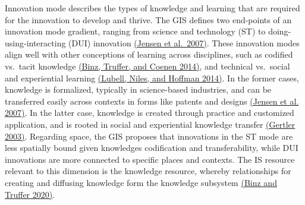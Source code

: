 \documentclass[twoside,12pt,final]{ucthesis-CA2012}
\begin{document}
\begin{ucmainmatter}
Innovation mode describes the types of knowledge and learning that are
required for the innovation to develop and thrive. The GIS defines two
end-points of an innovation mode gradient, ranging from \textquotesingle science and
technology\textquotesingle{} (ST) to \textquotesingle doing-using-interacting\textquotesingle{} (DUI) innovation
\href{https://www.zotero.org/google-docs/?hpQtSX}{(Jensen et al.~2007)}.
These innovation modes align well with other conceptions of learning
across disciplines, such as codified vs.~tacit knowledge \href{https://www.zotero.org/google-docs/?E8gm4b}{(Binz,
Truffer, and Coenen 2014)},
and technical vs.~social and experiential learning \href{https://www.zotero.org/google-docs/?bGAsYS}{(Lubell, Niles, and
Hoffman 2014)}. In the
former cases, knowledge is formalized, typically in science-based
industries, and can be transferred easily across contexts in forms like
patents and designs \href{https://www.zotero.org/google-docs/?izhG5P}{(Jensen et al.
2007)}. In the latter case,
knowledge is created through practice and customized application, and is
rooted in social and experiential knowledge transfer \href{https://www.zotero.org/google-docs/?pXgK0p}{(Gertler
2003)}. Regarding space, the
GIS proposes that innovations in the ST mode are less spatially bound
given knowledge\textquotesingle s codification and transferability, while DUI
innovations are more connected to specific places and contexts. The IS
resource relevant to this dimension is the knowledge resource, whereby
relationships for creating and diffusing knowledge form the knowledge
subsystem \href{https://www.zotero.org/google-docs/?2ytUvw}{(Binz and Truffer
2020)}.


\end{ucmainmatter}
\end{document}
